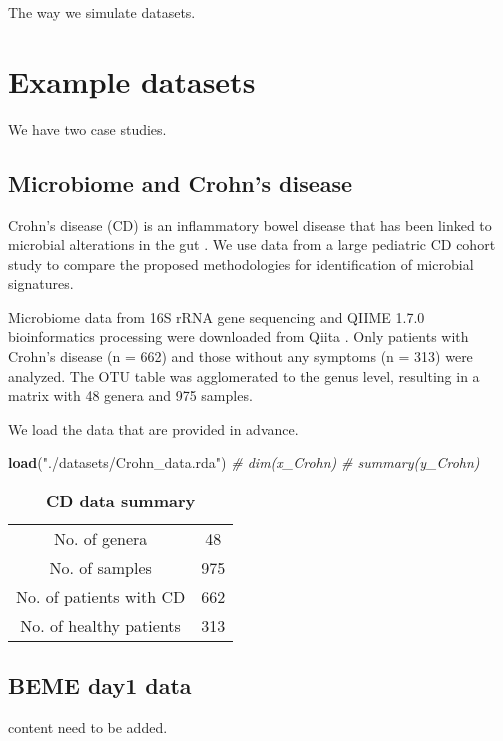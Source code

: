 \documentclass[]{book}
\newenvironment{Shaded}{\begin{snugshade}}{\end{snugshade}}
\newcommand{\KeywordTok}[1]{\textcolor[rgb]{0.13,0.29,0.53}{\textbf{#1}}}
\newcommand{\StringTok}[1]{\textcolor[rgb]{0.31,0.60,0.02}{#1}}
\newcommand{\CommentTok}[1]{\textcolor[rgb]{0.56,0.35,0.01}{\textit{#1}}}
\newcommand{\NormalTok}[1]{#1}
\begin{document}
The way we simulate datasets.

\section{Example datasets}\label{example-datasets}

We have two case studies.

\subsection{Microbiome and Crohn's
disease}\label{microbiome-and-crohns-disease}

Crohn's disease (CD) is an inflammatory bowel disease that has been
linked to microbial alterations in the gut
\citep{gevers2014treatment, oyri2015dysbiotic}. We use data from a large
pediatric CD cohort study \citep{gevers2014treatment} to compare the
proposed methodologies for identification of microbial signatures.

Microbiome data from 16S rRNA gene sequencing and QIIME 1.7.0
bioinformatics processing were downloaded from Qiita
\citep{rivera2018balances}. Only patients with Crohn's disease (n = 662)
and those without any symptoms (n = 313) were analyzed. The OTU table
was agglomerated to the genus level, resulting in a matrix with 48
genera and 975 samples.

We load the data that are provided in advance.

\begin{Shaded}
\begin{Highlighting}[]
\KeywordTok{load}\NormalTok{(}\StringTok{"./datasets/Crohn_data.rda"}\NormalTok{)}
\CommentTok{# dim(x_Crohn)}
\CommentTok{# summary(y_Crohn)}
\end{Highlighting}
\end{Shaded}

\begin{longtable}[]{@{}cc@{}}
\caption{\textbf{CD data summary}}\tabularnewline
\toprule
No. of genera & 48\tabularnewline
No. of samples & 975\tabularnewline
No. of patients with CD & 662\tabularnewline
No. of healthy patients & 313\tabularnewline
\bottomrule
\end{longtable}

\subsection{BEME day1 data}\label{beme-day1-data}

content need to be added.
\end{document}
